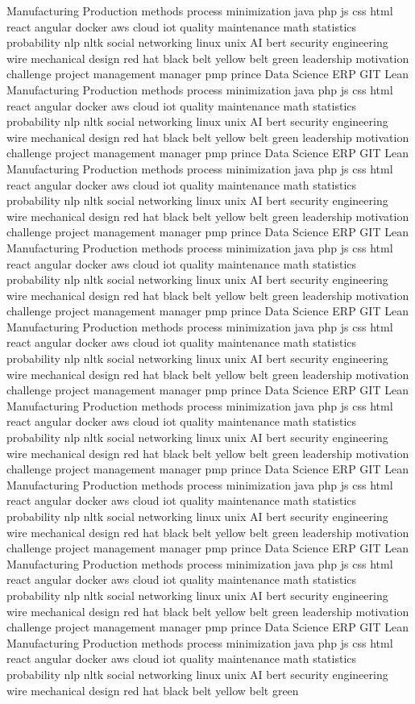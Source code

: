 \documentclass[letterpaper,11pt]{article}
\begin{document}
Manufacturing Production methods process minimization java php js css html react angular docker aws cloud iot quality maintenance math statistics probability nlp nltk social networking linux unix AI bert security engineering wire mechanical design red hat black belt yellow belt green leadership motivation challenge project management manager pmp prince Data Science ERP GIT Lean Manufacturing Production methods process minimization java php js css html react angular docker aws cloud iot quality maintenance math statistics probability nlp nltk social networking linux unix AI bert security engineering wire mechanical design red hat black belt yellow belt green leadership motivation challenge project management manager pmp prince Data Science ERP GIT Lean Manufacturing Production methods process minimization java php js css html react angular docker aws cloud iot quality maintenance math statistics probability nlp nltk social networking linux unix AI bert security engineering wire mechanical design red hat black belt yellow belt green leadership motivation challenge project management manager pmp prince Data Science ERP GIT Lean Manufacturing Production methods process minimization java php js css html react angular docker aws cloud iot quality maintenance math statistics probability nlp nltk social networking linux unix AI bert security engineering wire mechanical design red hat black belt yellow belt green leadership motivation challenge project management manager pmp prince Data Science ERP GIT Lean Manufacturing Production methods process minimization java php js css html react angular docker aws cloud iot quality maintenance math statistics probability nlp nltk social networking linux unix AI bert security engineering wire mechanical design red hat black belt yellow belt green leadership motivation challenge project management manager pmp prince Data Science ERP GIT Lean Manufacturing Production methods process minimization java php js css html react angular docker aws cloud iot quality maintenance math statistics probability nlp nltk social networking linux unix AI bert security engineering wire mechanical design red hat black belt yellow belt green leadership motivation challenge project management manager pmp prince Data Science ERP GIT Lean Manufacturing Production methods process minimization java php js css html react angular docker aws cloud iot quality maintenance math statistics probability nlp nltk social networking linux unix AI bert security engineering wire mechanical design red hat black belt yellow belt green leadership motivation challenge project management manager pmp prince Data Science ERP GIT Lean Manufacturing Production methods process minimization java php js css html react angular docker aws cloud iot quality maintenance math statistics probability nlp nltk social networking linux unix AI bert security engineering wire mechanical design red hat black belt yellow belt green leadership motivation challenge project management manager pmp prince Data Science ERP GIT Lean Manufacturing Production methods process minimization java php js css html react angular docker aws cloud iot quality maintenance math statistics probability nlp nltk social networking linux unix AI bert security engineering wire mechanical design red hat black belt yellow belt green 
\end{document}
